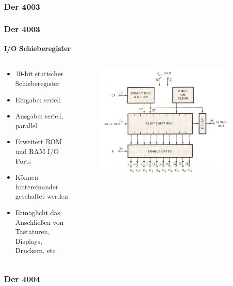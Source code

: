 \subsubsection{Der 4003}
\begin{frame}
	\frametitle{Der 4003}
	\framesubtitle{I/O Schieberegister}
	\begin{columns}
		\begin{column}{.5\textwidth}	
			\begin{itemize}
				\item 10-bit statisches Schieberegister
				\item Eingabe: seriell
				\item Ausgabe: seriell, parallel
				\item Erweitert ROM und RAM I/O Ports
				\item Können hintereinander geschaltet werden
				\item Ermöglicht das Anschließen von Tastaturen, Displays, Druckern, etc
			\end{itemize}
		\end{column}
		\begin{column}{.6\textwidth}
			\begin{figure}[ht]
				\includegraphics[width=1.1\linewidth]{images/layout_4003.png}
			\end{figure}
		\end{column}
	\end{columns}
\end{frame}

\subsubsection{Der 4004}

